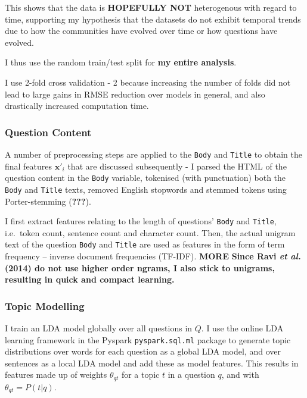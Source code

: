 \documentclass[11pt,preprint, authoryear]{article}
\numberwithin{equation}{section}
\begin{document}
\normalsize

This shows that the data is \textbf{HOPEFULLY NOT} heterogenous with
regard to time, supporting my hypothesis that the datasets do not
exhibit temporal trends due to how the communities have evolved over
time or how questions have evolved.

I thus use the random train/test split for \textbf{my entire analysis}.

I use 2-fold cross validation - 2 because increasing the number of folds
did not lead to large gains in RMSE reduction over models in general,
and also drastically increased computation time.

\subsubsection{Question Content}\label{question-content}

A number of preprocessing steps are applied to the \texttt{Body} and
\texttt{Title} to obtain the final features \(\bm{x'}_i\) that are
discussed subsequently - I parsed the HTML of the question content in
the \texttt{Body} variable, tokenised (with punctuation) both the
\texttt{Body} and \texttt{Title} texts, removed English stopwords and
stemmed tokens using Porter-stemming ({\textbf{???}}).

I first extract features relating to the length of questions'
\texttt{Body} and \texttt{Title}, i.e.~token count, sentence count and
character count. Then, the actual unigram text of the question
\texttt{Body} and \texttt{Title} are used as features in the form of
term frequency -- inverse document frequencies (TF-IDF). \textbf{MORE}
\textbf{Since Ravi \emph{et al.} (2014) do not use higher order ngrams,
I also stick to unigrams, resulting in quick and compact learning.}

\subsubsection{Topic Modelling}\label{topic-modelling}

I train an LDA model globally over all questions in \(Q\). I use the
online LDA learning framework in the Pyspark \texttt{pyspark.sql.ml}
package to generate topic distributions over words for each question as
a global LDA model, and over sentences as a local LDA model and add
these as model features. This results in features made up of weights
\(\theta_{qt}\) for a topic \(t\) in a question \(q\), and with
\(\theta_{qt}=P(t|q).\)
\end{document}
